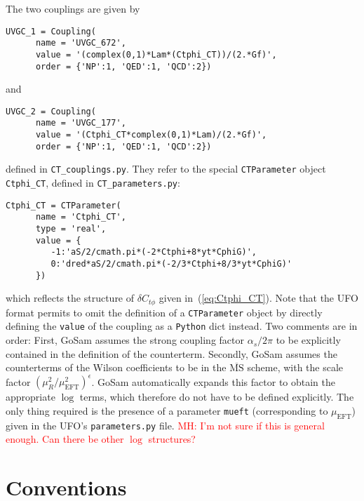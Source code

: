 \documentclass[11pt,a4paper]{refrep}
\newcommand{\gosam}{{\sc GoSam}\xspace}
\newcommand{\python}{{\tt Python}\xspace}
\begin{document}
The two couplings are given by
\begin{lstlisting}[gobble=3,%
     basicstyle=\ttfamily]
   UVGC_1 = Coupling(
      name = 'UVGC_672',
      value = '(complex(0,1)*Lam*(Ctphi_CT))/(2.*Gf)',
      order = {'NP':1, 'QED':1, 'QCD':2})
\end{lstlisting}
and
\begin{lstlisting}[gobble=3,%
     basicstyle=\ttfamily]
   UVGC_2 = Coupling(
      name = 'UVGC_177',
      value = '(Ctphi_CT*complex(0,1)*Lam)/(2.*Gf)',
      order = {'NP':1, 'QED':1, 'QCD':2})
\end{lstlisting}
defined in \texttt{CT\_couplings.py}. They refer to the special \texttt{CTParameter} object \texttt{Ctphi\_CT}, defined in \texttt{CT\_parameters.py}:
\begin{lstlisting}[gobble=3,%
     basicstyle=\ttfamily]
   Ctphi_CT = CTParameter(
      name = 'Ctphi_CT',
      type = 'real',
      value = {
         -1:'aS/2/cmath.pi*(-2*Ctphi+8*yt*CphiG)',
         0:'dred*aS/2/cmath.pi*(-2/3*Ctphi+8/3*yt*CphiG)'
      })
\end{lstlisting}
which reflects the structure of $\delta C_{t\phi}$ given in~(\ref{eq:Ctphi_CT}). Note that the UFO format permits to omit the definition of a \texttt{CTParameter} object by directly defining the \texttt{value} of the coupling as a \python dict instead.
Two comments are in order: First, \gosam assumes the strong coupling factor $\alpha_s/2\pi$ to be explicitly contained in the definition of the counterterm. Secondly, \gosam assumes the counterterms of the Wilson coefficients to be in the $\overline{\text{MS}}$ scheme, with the scale factor $\left(\mu_R^2/\mu_\mathrm{EFT}^2\right)^\epsilon$. \gosam automatically expands this factor to obtain the appropriate $\log$ terms, which therefore do not have to be defined explicitly. The only thing required is the presence of a parameter \texttt{mueft} (corresponding to $\mu_\mathrm{EFT}$) given in the UFO's \texttt{parameters.py} file. \textcolor{red}{MH: I'm not sure if this is general enough. Can there be other $\log$ structures?}


\appendix

\chapter{Conventions}
\label{sec:conventions}
\end{document}
